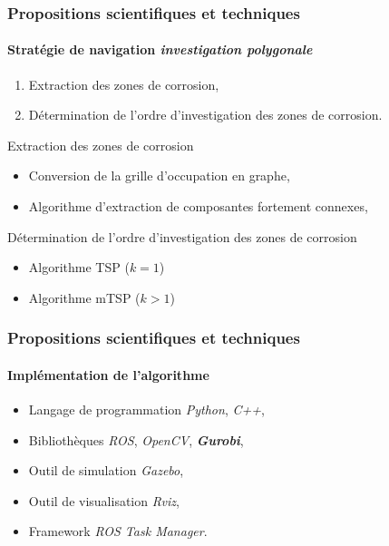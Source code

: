 \documentclass{beamer}
\begin{document}
			\begin{frame}
				\frametitle{Propositions scientifiques et techniques}
				\framesubtitle{Stratégie de navigation \textit{investigation polygonale}}
				\begin{enumerate}
					\item Extraction des zones de corrosion,
					\item Détermination de l'ordre d'investigation des zones de corrosion.
				\end{enumerate}
				\begin{block}{Extraction des zones de corrosion}
					\begin{itemize}
						\item Conversion de la grille d'occupation en graphe,
						\item Algorithme d'extraction de composantes fortement connexes,
					\end{itemize}
				\end{block}
				\begin{block}{Détermination de l'ordre d'investigation des zones de corrosion}
					\begin{itemize}
						\item Algorithme TSP ($k = 1$)
						\item Algorithme mTSP ($k > 1$)
					\end{itemize}
				\end{block}
			\end{frame}
			\begin{frame}
				\frametitle{Propositions scientifiques et techniques}
				\framesubtitle{Implémentation de l'algorithme}
				\begin{itemize}
					\item Langage de programmation \textit{Python}, \textit{C++},
					\item Bibliothèques \textit{ROS}, \textit{OpenCV}, \textbf{\textit{Gurobi}},
					\item Outil de simulation \textit{Gazebo},
					\item Outil de visualisation \textit{Rviz},
					\item Framework \textit{ROS Task Manager}.
				\end{itemize}
			\end{frame}
\end{document}
